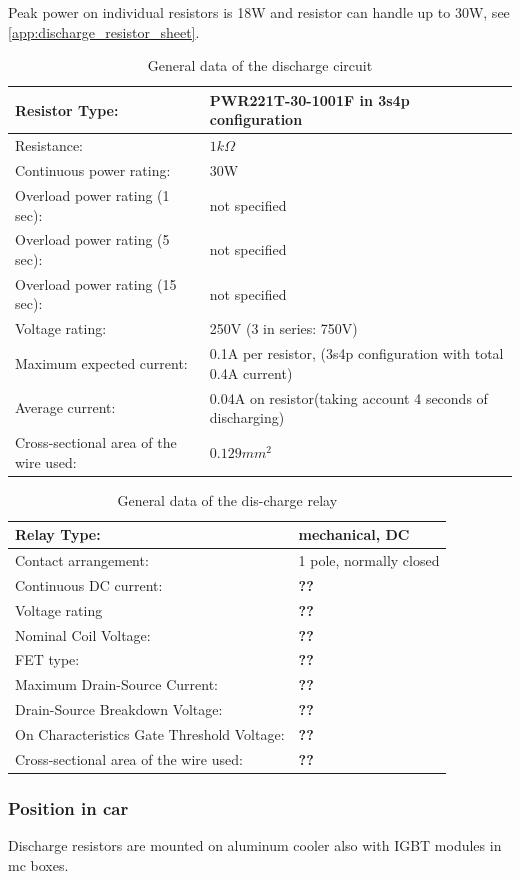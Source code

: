 Peak power on individual resistors is 18W and resistor can handle up to 30W, see \ref{app:discharge_resistor_sheet}.

\begin{table}[H]
	\centering
	\caption{General data of the discharge circuit}
	\begin{tabularx}{\textwidth}{|X|X|}
		\hline
		Resistor Type: & PWR221T-30-1001F in 3s4p configuration \\[\TableSize]
		\hline
		Resistance: & $1k\Omega$ \\[\TableSize]
		\hline
		Continuous power rating: & 30W \\[\TableSize]
		\hline
		Overload power rating (1 sec): & not specified \\[\TableSize]
		\hline
		Overload power rating (5 sec): & not specified \\[\TableSize]
		\hline
		Overload power rating (15 sec): & not specified \\[\TableSize]
		\hline
		Voltage rating: & 250V (3 in series: 750V) \\[\TableSize]
		\hline
		Maximum expected current: & 0.1A per resistor, (3s4p configuration with total 0.4A current) \\[\TableSize]
		\hline
		Average current: & 0.04A on resistor(taking account 4 seconds of discharging) \\[\TableSize]
		\hline
		Cross-sectional area of the wire used: & $0.129 mm^2$ \\[\TableSize]
		\hline
	\end{tabularx}%
	\label{tab:dischrage-circ}%
\end{table}%

\begin{table}[H]
	\centering
	\caption{General data of the dis-charge relay}
	\begin{tabularx}{\textwidth}{|X|X|}
		\hline
		Relay Type: & mechanical, DC \\[\TableSize]
		\hline
		Contact arrangement: & 1 pole, normally closed  \\[\TableSize]
		\hline
		Continuous DC current: & \textbf{??}  \\[\TableSize]
		\hline
		Voltage rating  & \textbf{??}\\[\TableSize]
		\hline
		Nominal Coil Voltage: & \textbf{??}\\[\TableSize]
		\hline
		FET type: & \textbf{??} \\[\TableSize]
		\hline
		Maximum Drain-Source Current: & \textbf{??}  \\[\TableSize]
		\hline
		Drain-Source Breakdown Voltage: & \textbf{??}  \\[\TableSize]
		\hline
		On Characteristics Gate Threshold Voltage: & \textbf{??} \\[\TableSize]
		\hline
		Cross-sectional area of the wire used: & \textbf{??} \\[\TableSize]
		\hline
	\end{tabularx}%
	\label{tab:discharge-relay}%
\end{table}%


\subsubsection{Position in car}

Discharge resistors are mounted on aluminum cooler also with IGBT modules in \gls{mc} boxes.
